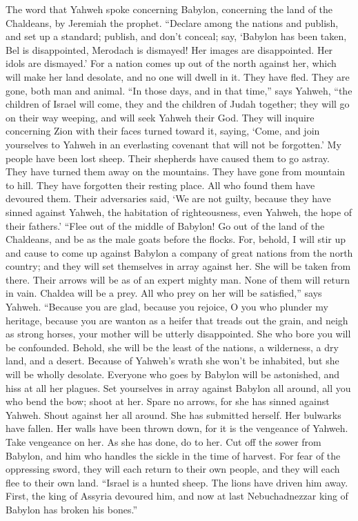 The word that Yahweh spoke concerning Babylon, concerning
the land of the Chaldeans, by Jeremiah the prophet. 
``Declare among the nations and publish, and set up a standard; publish,
and don't conceal; say, `Babylon has been taken, Bel is disappointed,
Merodach is dismayed! Her images are disappointed. Her idols are
dismayed.'  For a nation comes up out of the north against
her, which will make her land desolate, and no one will dwell in it.
They have fled. They are gone, both man and animal.  ``In
those days, and in that time,'' says Yahweh, ``the children of Israel
will come, they and the children of Judah together; they will go on
their way weeping, and will seek Yahweh their God.  They
will inquire concerning Zion with their faces turned toward it, saying,
`Come, and join yourselves to Yahweh in an everlasting covenant that
will not be forgotten.'  My people have been lost sheep.
Their shepherds have caused them to go astray. They have turned them
away on the mountains. They have gone from mountain to hill. They have
forgotten their resting place.  All who found them have
devoured them. Their adversaries said, `We are not guilty, because they
have sinned against Yahweh, the habitation of righteousness, even
Yahweh, the hope of their fathers.'  ``Flee out of the
middle of Babylon! Go out of the land of the Chaldeans, and be as the
male goats before the flocks.  For, behold, I will stir up
and cause to come up against Babylon a company of great nations from the
north country; and they will set themselves in array against her. She
will be taken from there. Their arrows will be as of an expert mighty
man. None of them will return in vain.  Chaldea will be a
prey. All who prey on her will be satisfied,'' says Yahweh.
 ``Because you are glad, because you rejoice, O you who
plunder my heritage, because you are wanton as a heifer that treads out
the grain, and neigh as strong horses,  your mother will be
utterly disappointed. She who bore you will be confounded. Behold, she
will be the least of the nations, a wilderness, a dry land, and a
desert.  Because of Yahweh's wrath she won't be inhabited,
but she will be wholly desolate. Everyone who goes by Babylon will be
astonished, and hiss at all her plagues.  Set yourselves in
array against Babylon all around, all you who bend the bow; shoot at
her. Spare no arrows, for she has sinned against Yahweh. 
Shout against her all around. She has submitted herself. Her bulwarks
have fallen. Her walls have been thrown down, for it is the vengeance of
Yahweh. Take vengeance on her. As she has done, do to her. 
Cut off the sower from Babylon, and him who handles the sickle in the
time of harvest. For fear of the oppressing sword, they will each return
to their own people, and they will each flee to their own land.
 ``Israel is a hunted sheep. The lions have driven him
away. First, the king of Assyria devoured him, and now at last
Nebuchadnezzar king of Babylon has broken his bones.''

